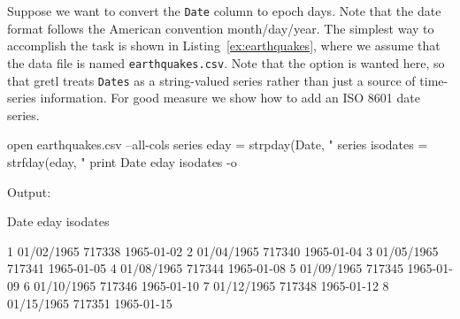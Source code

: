 \begin{center}
\end{center}

Suppose we want to convert the \texttt{Date} column to epoch
days. Note that the date format follows the American convention
month/day/year. The simplest way to accomplish the task is shown in
Listing~\ref{ex:earthquakes}, where we assume that the data file is
named \texttt{earthquakes.csv}. Note that the  option
is wanted here, so that gretl treats \texttt{Dates} as a string-valued
series rather than just a source of time-series information. For good
measure we show how to add an ISO 8601 date series.

\begin{script}[htbp]
  \label{ex:earthquakes}
\begin{scodebit}
open earthquakes.csv --all-cols
series eday = strpday(Date, "%
series isodates = strfday(eday, "%
print Date eday isodates -o
\end{scodebit}
  
Output:
\begin{outbit}
          Date         eday     isodates

1   01/02/1965       717338   1965-01-02
2   01/04/1965       717340   1965-01-04
3   01/05/1965       717341   1965-01-05
4   01/08/1965       717344   1965-01-08
5   01/09/1965       717345   1965-01-09
6   01/10/1965       717346   1965-01-10
7   01/12/1965       717348   1965-01-12
8   01/15/1965       717351   1965-01-15
\end{outbit}
\end{script}


